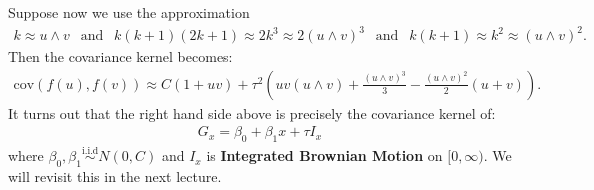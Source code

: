 \documentclass{scrartcl}
\begin{document}
Suppose now we use the approximation
\begin{align*}
  k \approx u \wedge v ~~ \text{ and } ~~ k(k+1)(2k+1) \approx 2k^3
  \approx 2(u \wedge v)^3 ~~ \text{ and } ~~ k(k+1) \approx k^2
  \approx (u \wedge v)^2. 
\end{align*}
Then the covariance kernel becomes:
\begin{align*}
  \text{cov}(f(u), f(v)) \approx C(1 + uv) + \tau^2 \left(u v (u
  \wedge v) + \frac{(u \wedge v)^3}{3} - \frac{(u \wedge v)^2}{2} (u + v)
  \right). 
\end{align*}
It turns out that the right hand side above is precisely the
covariance kernel of:
\begin{align*}
  G_x = \beta_0 + \beta_1 x + \tau I_x
\end{align*}
where $\beta_0, \beta_1 \overset{\text{i.i.d}}{\sim} N(0, C)$ and
$I_x$ is \textbf{Integrated Brownian Motion} on $[0, \infty)$. 
We will revisit this in the next lecture. 





  


  
 
\end{document}
